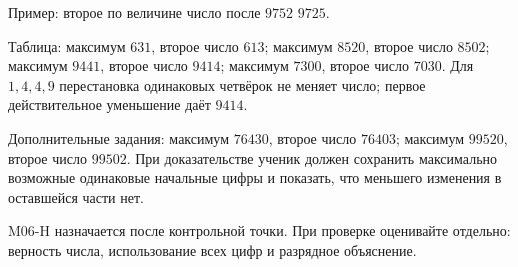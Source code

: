 \begin{teacherbox}[M06\(\star\)]
  Пример: второе по величине число после \(9752\) \textemdash{} \(9725\).

  Таблица: максимум \(631\), второе число \(613\); максимум \(8520\), второе
  число \(8502\); максимум \(9441\), второе число \(9414\); максимум \(7300\),
  второе число \(7030\).
  Для \(1,4,4,9\) перестановка одинаковых четвёрок не меняет число; первое
  действительное уменьшение даёт \(9414\).

  Дополнительные задания: максимум \(76430\), второе число \(76403\);
  максимум \(99520\), второе число \(99502\). При доказательстве ученик должен
  сохранить максимально возможные одинаковые начальные цифры и показать, что
  меньшего изменения в оставшейся части нет.
\end{teacherbox}

\begin{notebox}
  M06-H назначается после контрольной точки. При проверке оценивайте отдельно:
  верность числа, использование всех цифр и разрядное объяснение.
\end{notebox}
